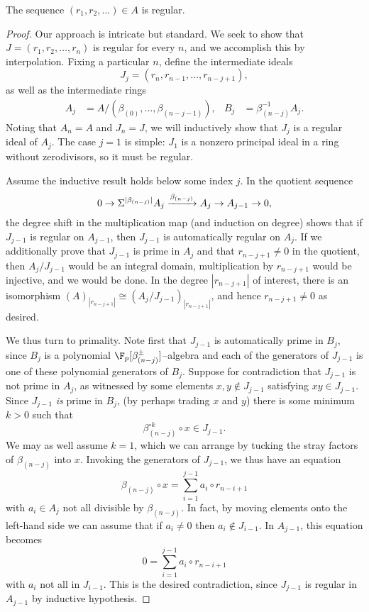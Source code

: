 \begin{lemma}
The sequence \((r_1, r_2, \ldots) \in A\) is regular.
\end{lemma}
\begin{proof}
Our approach is intricate but standard.  We seek to show that \(J = (r_1, r_2, \ldots, r_n)\) is regular for every \(n\), and we accomplish this by interpolation.  Fixing a particular \(n\), define the intermediate ideals \[J_j = (r_n, r_{n-1}, \ldots, r_{n-j+1}),\] as well as the intermediate rings
\begin{align*}
A_j & = A / (\beta_{(0)}, \ldots, \beta_{(n-j-1)}), &
B_j & = \beta_{(n-j)}^{-1} A_j.
\end{align*}
Noting that \(A_n = A\) and \(J_n = J\), we will inductively show that \(J_j\) is a regular ideal of \(A_j\).  The case \(j = 1\) is simple: \(J_1\) is a nonzero principal ideal in a ring without zerodivisors, so it must be regular.

Assume the inductive result holds below some index \(j\).  In the quotient sequence \[0 \to \Sigma^{|\beta_{(n-j)}|} A_j \xrightarrow{\beta_{(n-j)}} A_j \to A_{j-1} \to 0,\] the degree shift in the multiplication map (and induction on degree) shows that if \(J_{j-1}\) is regular on \(A_{j-1}\), then \(J_{j-1}\) is automatically regular on \(A_j\).  If we additionally prove that \(J_{j-1}\) is prime in \(A_j\) and that \(r_{n-j+1} \ne 0\) in the quotient, then \(A_j / J_{j-1}\) would be an integral domain, multiplication by \(r_{n-j+1}\) would be injective, and we would be done.  In the degree \(|r_{n-j+1}|\) of interest, there is an isomorphism \((A)_{|r_{n-j+1}|} \cong (A_j / J_{j-1})_{|r_{n-j+1}|}\), and hence \(r_{n-j+1} \ne 0\) as desired.

We thus turn to primality.  Note first that \(J_{j-1}\) is automatically prime in \(B_j\), since \(B_j\) is a polynomial \(\F_p[\beta_{(n-j)}^\pm]\)--algebra and each of the generators of \(J_{j-1}\) is one of these polynomial generators of \(B_j\).  Suppose for contradiction that \(J_{j-1}\) is not prime in \(A_j\), as witnessed by some elements \(x, y \not\in J_{j-1}\) satisfying \(xy \in J_{j-1}\).  Since \(J_{j-1}\) \emph{is} prime in \(B_j\), (by perhaps trading \(x\) and \(y\)) there is some minimum \(k > 0\) such that \[\beta_{(n-j)}^{\circ k} \circ x \in J_{j-1}.\]  We may as well assume \(k = 1\), which we can arrange by tucking the stray factors of \(\beta_{(n-j)}\) into \(x\).  Invoking the generators of \(J_{j-1}\), we thus have an equation \[\beta_{(n-j)} \circ x = \sum_{i = 1}^{j-1} a_i \circ r_{n-i+1}\] with \(a_i \in A_j\) not all divisible by \(\beta_{(n-j)}\).  In fact, by moving elements onto the left-hand side we can assume that if \(a_i \ne 0\) then \(a_i \not\in J_{i-1}\).  In \(A_{j-1}\), this equation becomes \[0 = \sum_{i=1}^{j-1} a_i \circ r_{n-i+1}\] with \(a_i\) not all in \(J_{i-1}\).  This is the desired contradiction, since \(J_{j-1}\) is regular in \(A_{j-1}\) by inductive hypothesis.
\end{proof}

